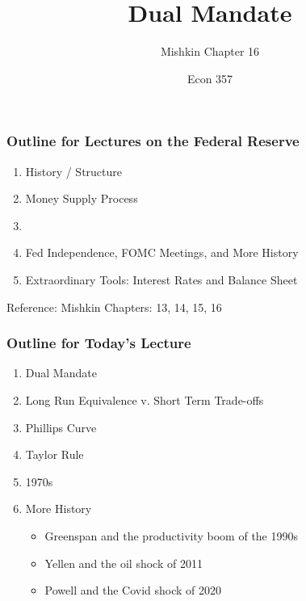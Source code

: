 \documentclass{beamer}
\title{Dual Mandate}
\subtitle{Mishkin Chapter 16}
\author{Econ 357}
\date{\week}
\begin{document}
\frame{\titlepage}

\begin{frame}
    \frametitle{Outline for Lectures on the Federal Reserve}

    \begin{enumerate}
        \item History / Structure
        \item Money Supply Process
        \item {}
        \item Fed Independence, FOMC Meetings, and More History
        \item Extraordinary Tools: Interest Rates and Balance Sheet
    \end{enumerate}
    \vspace{1em}
    Reference: Mishkin Chapters: 13, 14, 15, 16

\end{frame}

\begin{frame}
    \frametitle{Outline for Today's Lecture}
    
    \begin{enumerate}
        \item Dual Mandate
        \item Long Run Equivalence v. Short Term Trade-offs
        \item Phillips Curve
        \item Taylor Rule
        \item 1970s
        \item More History
        \begin{itemize}
            \item Greenspan and the productivity boom of the 1990s
            \item Yellen and the oil shock of 2011
            \item Powell and the Covid shock of 2020
        \end{itemize}
    \end{enumerate}

\end{frame}
\end{document}
